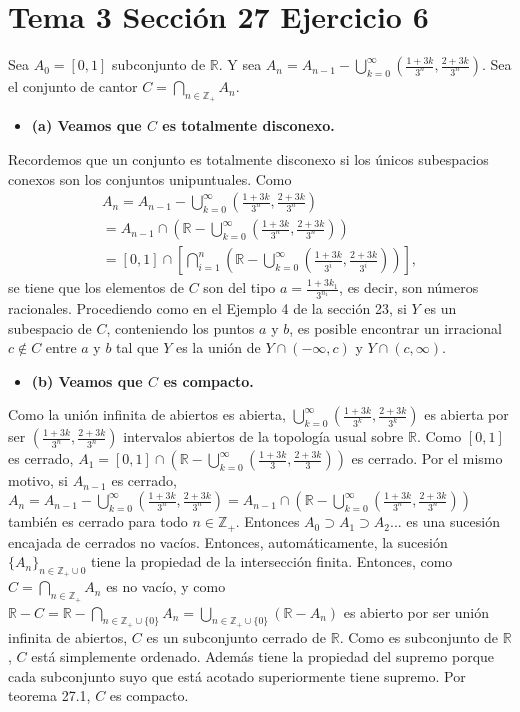 \documentclass{article}
\begin{document}
\section{Tema 3 Sección 27 Ejercicio 6}
Sea $A_0=[0,1]$ subconjunto de $\mathbb{R}$. Y sea $A_n=A_{n-1}-\bigcup_{k=0}^\infty \left(\frac{1+3k}{3^n},\frac{2+3k}{3^n}\right)$. Sea el conjunto de cantor $C=\bigcap_{n\in \mathbb{Z}_+}A_n$.
\begin{itemize}
\item \bf (a) \rm Veamos que $C$ es totalmente disconexo.
\end{itemize}
Recordemos que un conjunto es totalmente disconexo si los únicos subespacios conexos son los conjuntos unipuntuales. Como
\begin{eqnarray} A_n=A_{n-1}-\bigcup_{k=0}^\infty\left(\frac{1+3k}{3^n},\frac{2+3k}{3^n}\right)\nonumber\\
=A_{n-1}\cap\left(\mathbb{R}-\bigcup_{k=0}^\infty\left(\frac{1+3k}{3^n},\frac{2+3k}{3^n}\right)\right)\nonumber\\
=[0,1]\cap\left[\bigcap_{i=1}^n\left(\mathbb{R}-\bigcup_{k=0}^\infty\left(\frac{1+3k}{3^i},\frac{2+3k}{3^i}\right)\right)\right],\nonumber
\end{eqnarray}
se tiene que los elementos de $C$ son del tipo $a=\frac{1+3k_1}{3^{n_{1}}}$, es decir, son números racionales. Procediendo como en el Ejemplo 4 de la sección 23, si $Y$ es un subespacio de $C$, conteniendo los puntos $a$ y $b$, es posible encontrar un irracional $c\notin C$ entre $a$ y $b$ tal que $Y$ es la unión de $Y\cap (-\infty,c)$ y $Y \cap (c,\infty)$. 
\begin{itemize}
\item \bf (b) \rm Veamos que $C$ es compacto.
\end{itemize}
Como la unión infinita de abiertos es abierta, $\bigcup_{k=0}^\infty \left(\frac{1+3k}{3^k},\frac{2+3k}{3^k}\right)$ es abierta por ser $\left(\frac{1+3k}{3^n},\frac{2+3k}{3^n}\right)$ intervalos abiertos de la topología usual sobre $\mathbb{R}$. Como $[0,1]$ es cerrado, $A_1=[0,1]\cap \left(\mathbb{R}-\bigcup_{k=0}^\infty \left(\frac{1+3k}{3},\frac{2+3k}{3}\right)\right)$ es cerrado. Por el mismo motivo, si $A_{n-1}$ es cerrado, $A_n=A_{n-1}-\bigcup_{k=0}^\infty\left(\frac{1+3k}{3^n},\frac{2+3k}{3^n}\right)=A_{n-1}\cap\left(\mathbb{R}-\bigcup_{k=0}^\infty\left(\frac{1+3k}{3^n},\frac{2+3k}{3^n}\right)\right)$ también es cerrado para todo $n\in \mathbb{Z}_+$. Entonces $A_0\supset A_1\supset A_2...$ es una sucesión encajada de cerrados no vacíos. Entonces, automáticamente, la sucesión $\{A_n\}_{n\in \mathbb{Z}_+\cup 0}$ tiene la propiedad de la intersección finita. Entonces, como $C=\bigcap_{n\in\mathbb{Z}_+}A_n$ es no vacío, y como $\mathbb{R}-C=\mathbb{R}-\bigcap_{n\in\mathbb{Z}_+\cup \{0\}}A_n=\bigcup_{n\in\mathbb{Z}_+\cup \{0\}}\left(\mathbb{R}-A_n\right)$ es abierto por ser unión infinita de abiertos, $C$ es un subconjunto cerrado de $\mathbb{R}$. Como es subconjunto de $\mathbb{R}$, $C$ está simplemente ordenado. Además tiene la propiedad del supremo porque cada subconjunto suyo que está acotado superiormente tiene supremo. Por teorema 27.1, $C$ es compacto.
\end{document}
